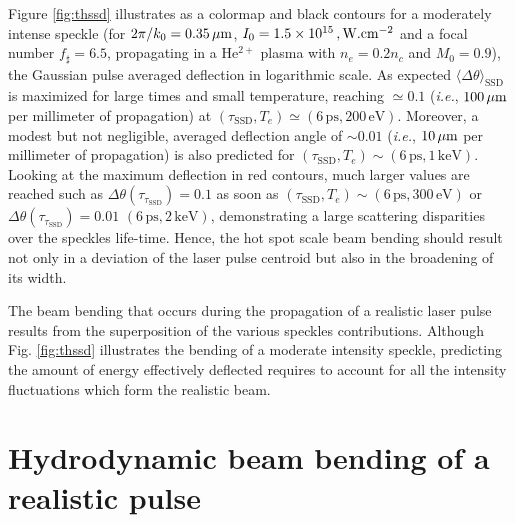 \documentclass[%
 reprint,
 amsmath,amssymb,
 aps,
]{revtex4-1}
\begin{document}
Figure \ref{fig:thssd} illustrates as a colormap and black contours for a moderately intense speckle (for  $2\pi/k_0=0.35\,\rm\mu m$,  $I_0=1.5\times 10^{15}\, ,\rm W.cm^{-2}$ and a focal number  $f_\sharp=6.5$, propagating in  a  He$^{2+}$ plasma with $n_e=0.2n_c$ and $M_0=0.9$),   the Gaussian pulse averaged   deflection  in logarithmic scale. As expected $\langle \Delta \theta \rangle_\mathrm{SSD}$ is maximized for large times and small temperature, reaching $\simeq 0.1$ (\emph{i.e.}, $100\, \rm \mu m$ per millimeter of propagation) at $(\tau_\mathrm{SSD}, T_e) \simeq (6 \, \mathrm{ps}, 200\,\mathrm{eV})$.
Moreover, a modest but not negligible, averaged deflection angle of $\sim 0.01$ (\emph{i.e.}, $10\, \rm \mu m$ per millimeter of propagation)  is also predicted for  
$(\tau_\mathrm{SSD}, T_e) \sim (6 \, \mathrm{ps}, 1\,\mathrm{keV})$.
Looking at the maximum deflection  in red contours, much larger values are reached such as $\Delta \theta(\tau_{\tau_\mathrm{SSD}})=0.1$  as soon as $(\tau_\mathrm{SSD}, T_e) \sim (6 \, \mathrm{ps}, 300\,\mathrm{eV})$ or $\Delta \theta(\tau_{\tau_\mathrm{SSD}})=0.01$   $  (6 \, \mathrm{ps}, 2\,\mathrm{keV})$, demonstrating a large scattering disparities over the speckles life-time. Hence, the  hot spot scale beam bending should result not only in a deviation of the laser  pulse centroid but also in the broadening of its  width. 

The beam bending that occurs during the propagation of a realistic laser pulse results from the superposition of the  various  speckles contributions. 
Although Fig. \ref{fig:thssd} illustrates the  bending of  a moderate intensity speckle,  predicting the amount of energy effectively deflected  requires to account for all the intensity fluctuations which form the realistic beam. 


\section{Hydrodynamic beam bending of a realistic pulse}
\end{document}
